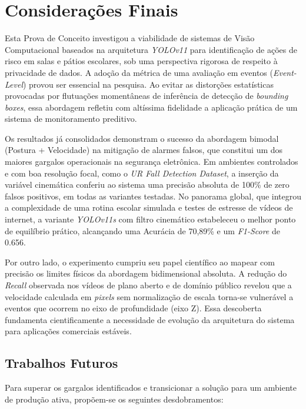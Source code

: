 \documentclass[12pt]{article}
\begin{document}
\section{Considerações Finais}

Esta Prova de Conceito investigou a viabilidade de sistemas de Visão Computacional baseados na
arquitetura \textit{YOLOv11} para identificação de ações de risco em salas e pátios escolares,
sob uma perspectiva rigorosa de respeito à privacidade de dados. A adoção da métrica de uma
avaliação em eventos (\textit{Event-Level}) provou ser essencial na pesquisa. Ao evitar as
distorções estatísticas provocadas por flutuações momentâneas de inferência de detecção de
\textit{bounding boxes}, essa abordagem refletiu com altíssima fidelidade a aplicação prática
de um sistema de monitoramento preditivo.

Os resultados já consolidados demonstram o sucesso da abordagem bimodal (Postura + Velocidade)
na mitigação de alarmes falsos, que constitui um dos maiores gargalos operacionais na segurança
eletrônica. Em ambientes controlados e com boa resolução focal, como o \textit{UR Fall Detection Dataset},
a inserção da variável cinemática conferiu ao sistema uma precisão absoluta de 100\% de zero
falsos positivos, em todas as variantes testadas. No panorama global, que integrou a complexidade
de uma rotina escolar simulada e testes de estresse de vídeos de internet, a variante \textit{YOLOv11s}
com filtro cinemático estabeleceu o melhor ponto de equilíbrio prático, alcançando uma Acurácia
de 70,89\% e um \textit{F1-Score} de 0.656.

Por outro lado, o experimento cumpriu seu papel científico ao mapear com precisão os limites
físicos da abordagem bidimensional absoluta. A redução do \textit{Recall} observada nos vídeos
de plano aberto e de domínio público revelou que a velocidade calculada em \textit{pixels}
sem normalização de escala torna-se vulnerável a eventos que ocorrem no eixo de profundidade
(eixo Z). Essa descoberta fundamenta cientificamente a necessidade de evolução da arquitetura
do sistema para aplicações comerciais estáveis.

\subsection{Trabalhos Futuros}

Para superar os gargalos identificados e transicionar a solução para um ambiente de produção
ativa, propõem-se os seguintes desdobramentos:
\end{document}
